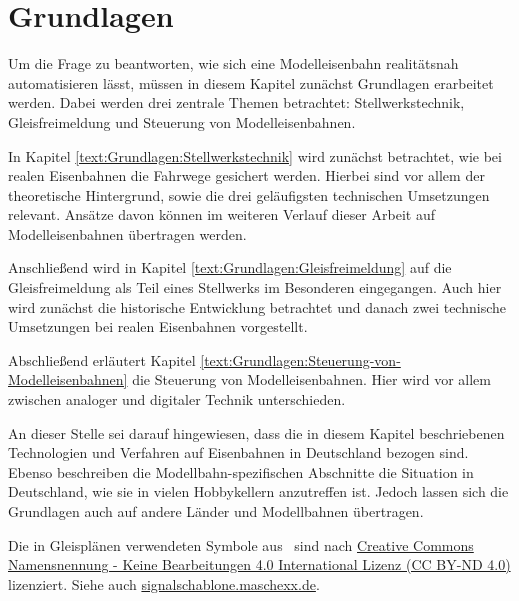 \chapter{Grundlagen}\label{text:Grundlagen}

Um die Frage zu beantworten, wie sich eine Modelleisenbahn realitätsnah automatisieren lässt, müssen in diesem Kapitel zunächst Grundlagen erarbeitet werden. Dabei werden drei zentrale Themen betrachtet: Stellwerkstechnik, Gleisfreimeldung und Steuerung von Modelleisenbahnen.

In Kapitel \autoref{text:Grundlagen:Stellwerkstechnik}  wird zunächst betrachtet, wie bei realen Eisenbahnen die Fahrwege gesichert werden. Hierbei sind vor allem der theoretische Hintergrund, sowie die drei geläufigsten technischen Umsetzungen relevant. Ansätze davon können im weiteren Verlauf dieser Arbeit auf Modelleisenbahnen übertragen werden.

Anschließend wird in Kapitel \autoref{text:Grundlagen:Gleisfreimeldung}  auf die Gleisfreimeldung als Teil eines Stellwerks im Besonderen eingegangen. Auch hier wird zunächst die historische Entwicklung betrachtet und danach zwei technische Umsetzungen bei realen Eisenbahnen vorgestellt.

Abschließend erläutert Kapitel \autoref{text:Grundlagen:Steuerung-von-Modelleisenbahnen}  die Steuerung von Modelleisenbahnen. Hier wird vor allem zwischen analoger und digitaler Technik unterschieden.

An dieser Stelle sei darauf hingewiesen, dass die in diesem Kapitel beschriebenen Technologien und Verfahren auf Eisenbahnen in Deutschland bezogen sind. Ebenso beschreiben die Modellbahn-spezifischen Abschnitte die Situation in Deutschland, wie sie in vielen Hobbykellern anzutreffen ist. Jedoch lassen sich die Grundlagen auch auf andere Länder und Modellbahnen übertragen.

Die in Gleisplänen verwendeten Symbole aus~\cite{bib:Signalschablone} sind nach \href{https://creativecommons.org/licenses/by-nd/4.0/deed.de}{Creative Commons Namensnennung - Keine Bearbeitungen 4.0 International Lizenz (CC BY-ND 4.0)} lizenziert. Siehe auch \url{signalschablone.maschexx.de}.

\newpage


\newpage


\newpage

